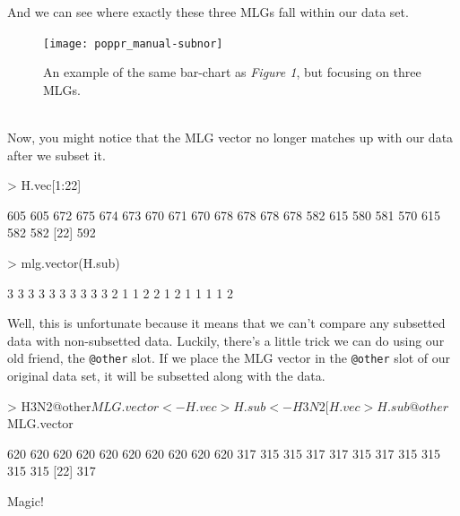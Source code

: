 \documentclass[letterpaper]{article}
\begin{document}
And we can see where exactly these three MLGs fall within our data set.
\begin{figure}[h!]
  \centering
  \caption{\footnotesize An example of the same bar-chart as \textit{Figure 1}, but focusing on three MLGs.}
  \label{nortable2}
\texttt{[image: poppr\_manual-subnor]}
\end{figure}
\\
\newpage
Now, you might notice that the MLG vector no longer matches up with our data after we subset it.
\begin{Schunk}
\begin{Sinput}
> H.vec[1:22]
\end{Sinput}
\begin{Soutput}
 [1] 605 605 672 675 674 673 670 671 670 678 678 678 678 582 615 580 581 570 615 582 582
[22] 592
\end{Soutput}
\begin{Sinput}
> mlg.vector(H.sub)
\end{Sinput}
\begin{Soutput}
 [1] 3 3 3 3 3 3 3 3 3 3 2 1 1 2 2 1 2 1 1 1 1 2
\end{Soutput}
\end{Schunk}
Well, this is unfortunate because it means that we can't compare any subsetted data with non-subsetted data. Luckily, there's a little trick we can do using our old friend, the \texttt{@other} slot.
If we place the MLG vector in the \texttt{@other} slot of our original data set, it will be subsetted along with the data.
\begin{Schunk}
\begin{Sinput}
> H3N2@other$MLG.vector <- H.vec
> H.sub <- H3N2[H.vec %
> H.sub@other$MLG.vector
\end{Sinput}
\begin{Soutput}
 [1] 620 620 620 620 620 620 620 620 620 620 317 315 315 317 317 315 317 315 315 315 315
[22] 317
\end{Soutput}
\end{Schunk}
Magic!\\
\end{document}
